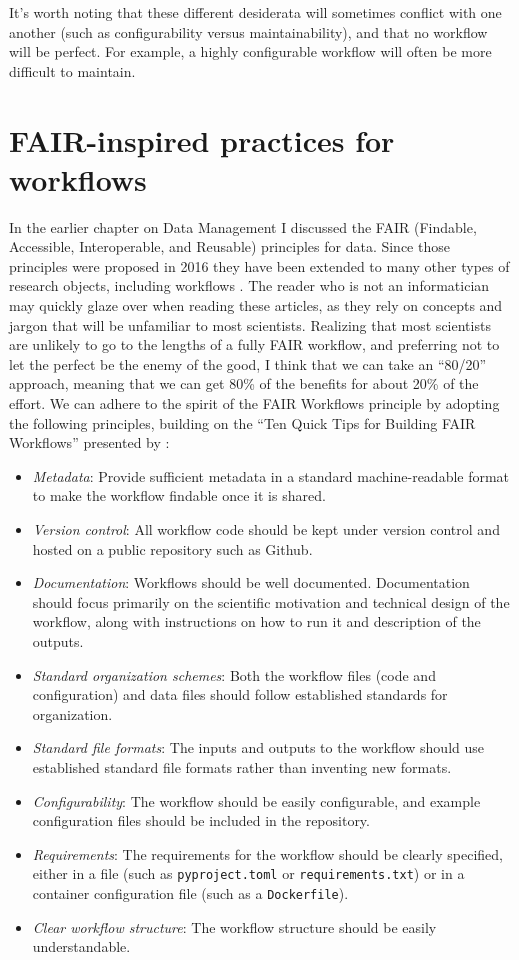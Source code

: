 It's worth noting that these different desiderata will sometimes conflict with one another (such as configurability versus maintainability), and that no workflow will be perfect.  For example, a highly configurable workflow will often be more difficult to maintain.

\section{FAIR-inspired practices for workflows}

In the earlier chapter on Data Management I discussed the FAIR (Findable, Accessible, Interoperable, and Reusable) principles for data.  Since those principles were proposed in 2016 they have been extended to many other types of research objects, including workflows \citep{Wilkinson:2025aa}.  The reader who is not an informatician may quickly glaze over when reading these articles, as they rely on concepts and jargon that will be unfamiliar to most scientists. Realizing that most scientists are unlikely to go to the lengths of a fully FAIR workflow, and preferring not to let the perfect be the enemy of the good, I think that we can take an ``80/20'' approach, meaning that we can get 80\% of the benefits for about 20\% of the effort.  We can adhere to the spirit of the FAIR Workflows principle by adopting the following principles, building on the ``Ten Quick Tips for Building FAIR Workflows'' presented by \citet{Visser:2023aa}:

\begin{itemize}
\item \textit{Metadata}:  Provide sufficient metadata in a standard machine-readable format to make the workflow findable once it is shared.
\item \textit{Version control}:  All workflow code should be kept under version control and hosted on a public repository such as Github.
\item \textit{Documentation}: Workflows should be well documented. Documentation should focus primarily on the scientific motivation and technical design of the workflow, along with instructions on how to run it and description of the outputs.
\item \textit{Standard organization schemes}: Both the workflow files (code and configuration) and data files should follow established standards for organization.
\item \textit{Standard file formats}: The inputs and outputs to the workflow should use established standard file formats rather than inventing new formats.
\item \textit{Configurability}: The workflow should be easily configurable, and example configuration files should be included in the repository.
\item \textit{Requirements}: The requirements for the workflow should be clearly specified, either in a file (such as \texttt{pyproject.toml} or \texttt{requirements.txt}) or in a container configuration file (such as a \texttt{Dockerfile}).
\item \textit{Clear workflow structure}: The workflow structure should be easily understandable.
\end{itemize}

